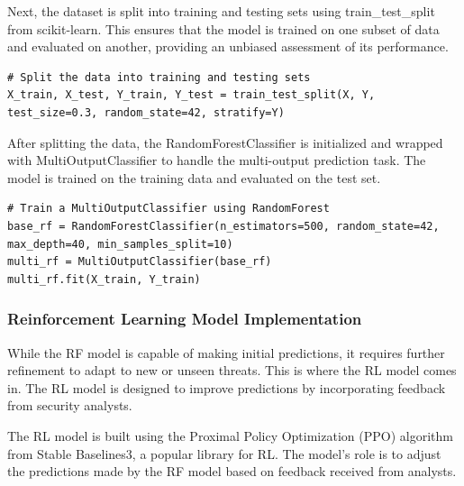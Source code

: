 Next, the dataset is split into training and testing sets using train\_test\_split from scikit-learn. 
This ensures that the model is trained on one subset of data and evaluated on another, providing an unbiased assessment of its performance.

\vspace{0.2cm}
\noindent
\begin{minipage}{\linewidth}
\begin{verbatim}
# Split the data into training and testing sets
X_train, X_test, Y_train, Y_test = train_test_split(X, Y, test_size=0.3, random_state=42, stratify=Y)
\end{verbatim}
\label{lst:splitting_dataset}
\end{minipage}
\vspace{0.1cm}

After splitting the data, the RandomForestClassifier is initialized and wrapped with MultiOutputClassifier to handle the multi-output prediction task. 
The model is trained on the training data and evaluated on the test set. 

\vspace{0.2cm}
\noindent
\begin{minipage}{\linewidth}
\begin{verbatim}
# Train a MultiOutputClassifier using RandomForest
base_rf = RandomForestClassifier(n_estimators=500, random_state=42, max_depth=40, min_samples_split=10)
multi_rf = MultiOutputClassifier(base_rf)
multi_rf.fit(X_train, Y_train)
\end{verbatim}
\label{lst:training_rf_model}
\end{minipage}
\vspace{0.1cm}

\subsubsection{Reinforcement Learning Model Implementation}

While the RF model is capable of making initial predictions, it requires further refinement to adapt to new or unseen threats. 
This is where the RL model comes in. The RL model is designed to improve predictions by incorporating feedback from security analysts.

The RL model is built using the Proximal Policy Optimization (PPO) algorithm from Stable Baselines3, a popular library for RL. 
The model's role is to adjust the predictions made by the RF model based on feedback received from analysts. 

